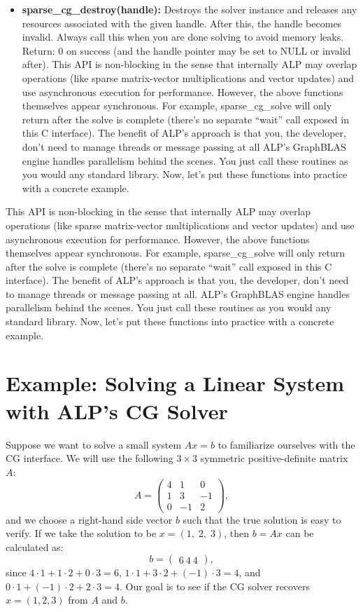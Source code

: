 \begin{itemize}
\item \textbf{sparse\_cg\_destroy(handle):} Destroys the solver instance and releases any resources associated with the given handle. After this, the handle becomes invalid. Always call this when you are done solving to avoid memory leaks. Return: 0 on success (and the handle pointer may be set to NULL or invalid after). This API is non-blocking in the sense that internally ALP may overlap operations (like sparse matrix-vector multiplications and vector updates) and use asynchronous execution for performance. However, the above functions themselves appear synchronous. For example, sparse\_cg\_solve will only return after the solve is complete (there’s no separate “wait” call exposed in this C interface). The benefit of ALP’s approach is that you, the developer, don’t need to manage threads or message passing at all ALP’s GraphBLAS engine handles parallelism behind the scenes. You just call these routines as you would any standard library. Now, let’s put these functions into practice with a concrete example.
\end{itemize}

This API is non-blocking in the sense that internally ALP may overlap operations (like sparse matrix-vector multiplications and vector updates) and use asynchronous execution for performance. However, the above functions themselves appear synchronous. For example, sparse\_cg\_solve will only return after the solve is complete (there’s no separate “wait” call exposed in this C interface). The benefit of ALP’s approach is that you, the developer, don’t need to manage threads or message passing at all. ALP’s GraphBLAS engine handles parallelism behind the scenes. You just call these routines as you would any standard library. Now, let’s put these functions into practice with a concrete example.

  
\section{Example: Solving a Linear System with ALP’s CG Solver}

Suppose we want to solve a small system $Ax = b$ to familiarize ourselves with the CG interface. We will use the following $3 \times 3$ symmetric positive-definite matrix $A$: $$ A = \begin{pmatrix} 4 & 1 & 0\\ 
        1 & 3 & -1\\ 
        0 & -1 & 2 \end{pmatrix}, $$ 
        and we choose a right-hand side vector $b$ such that the true solution is easy to verify. If we take the solution to be $x = (1,\;2,\;3)$, then $b = A x$ can be calculated as: $$ b = \begin{pmatrix}6 \ 4 \ 4 \end{pmatrix}, $$ since $4\cdot1 + 1\cdot2 + 0\cdot3 = 6$, $1\cdot1 + 3\cdot2 + (-1)\cdot3 = 4$, and $0\cdot1 + (-1)\cdot2 + 2\cdot3 = 4$. Our goal is to see if the CG solver recovers $x = (1,2,3)$ from $A$ and $b$. 
        

